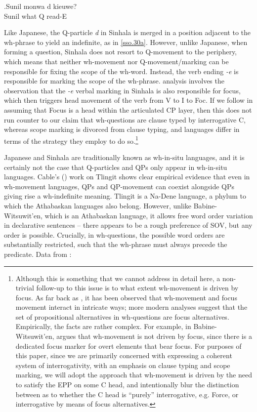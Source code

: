\documentclass[11pt]{article}
\begin{document}
\exg.\label{sso.31}Sunil mon{\textschwa}wa d{\textschwa} kieuwe?\\
   Sunil what Q read-E\\

Like Japanese, the Q-particle \textit{d\textschwa} in Sinhala is merged in a position adjacent to the wh-phrase to yield an indefinite, as in \ref{sso.30a}. However, unlike Japanese, when forming a question, Sinhala does not resort to Q-movement to the periphery, which means that neither wh-movement nor Q-movement/marking can be responsible for fixing the scope of the wh-word. Instead, the verb ending \textit{-e} is responsible for marking the scope of the wh-phrase. \cite{slade:2011} analysis involves the observation that the \textit{-e} verbal marking in Sinhala is also responsible for focus, which then triggers head movement of the verb from V to I to Foc. If we follow \cite{rizzi:97} in assuming that Focus is a head within the articulated CP layer, then this does not run counter to our claim that wh-questions are clause typed by interrogative C, whereas scope marking is divorced from clause typing, and languages differ in terms of the strategy they employ to do so.\footnote{Although this is something that we cannot address in detail here, a non-trivial follow-up to this issue is to what extent wh-movement is driven by focus. As far back as \cite{Huang:1982}, it has been observed that wh-movement and focus movement interact in intricate ways; more modern analyses \citep{beck:2006} suggest that the set of propositional alternatives in wh-questions are focus alternatives. Empirically, the facts are rather complex. For example, in Babine-Witsuwit'en, \cite{denham:00} argues that wh-movement is not driven by focus, since there is a dedicated focus marker for overt elements that bear focus. For purposes of this paper, since we are primarily concerned with expressing a coherent system of interrogativity, with an emphasis on clause typing and scope marking, we will adopt the approach that wh-movement is driven by the need to satisfy the EPP on some C head, and intentionally blur the distinction between as to whether the C head is ``purely'' interrogative, e.g. Force, or interrogative by means of focus alternatives.}

Japanese and Sinhala are traditionally known as wh-in-situ languages, and it is certainly not the case that Q-particles and QPs only appear in wh-in-situ languages. Cable's (\citeyear{cable:2007}) work on Tlingit shows clear empirical evidence that even in wh-movement languages, QPs and QP-movement can coexist alongside QPs giving rise a wh-indefinite meaning. Tlingit is a Na-Dene language, a phylum to which the Athabaskan languages also belong. However, unlike Babine-Witsuwit'en, which is an Athabaskan language, it allows free word order variation in declarative sentences -- there appears to be a rough preference of SOV, but any order is possible. Crucially, in wh-questions, the possible word orders are substantially restricted, such that the wh-phrase must always precede the predicate. Data from \cite[63--66]{cable:2007}:
\end{document}
